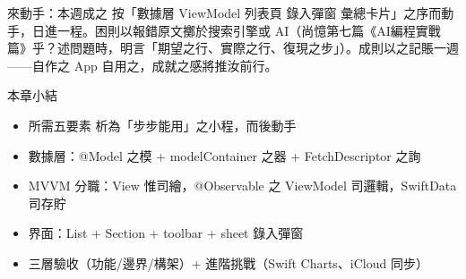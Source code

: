 \begin{tcbpractice}{來動手：本週成之}
按「數據層 ViewModel 列表頁 錄入彈窗 彙總卡片」之序而動手，日進一程。困則以報錯原文擲於搜索引擎或 AI（尚憶第七篇《AI編程實戰篇》乎？述問題時，明言「期望之行、實際之行、復現之步」）。成則以之記賬一週——自作之 App 自用之，成就之感將推汝前行。

\end{tcbpractice}

\begin{tcbsummary}{本章小結}
\begin{itemize}
  \item 所需五要素 析為「步步能用」之小程，而後動手
  \item 數據層：@Model 之模 + modelContainer 之器 + FetchDescriptor 之詢
  \item MVVM 分職：View 惟司繪，@Observable 之 ViewModel 司邏輯，SwiftData 司存貯
  \item 界面：List + Section + toolbar + sheet 錄入彈窗
  \item 三層驗收（功能/邊界/構架）+ 進階挑戰（Swift Charts、iCloud 同步）
\end{itemize}

\end{tcbsummary}
